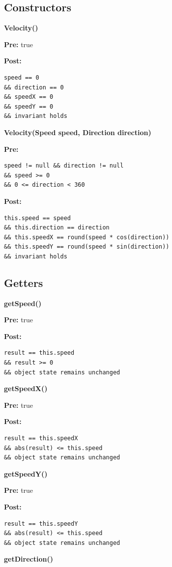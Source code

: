 \subsection*{Constructors}

\textbf{Velocity()}

\textbf{Pre:} true

\textbf{Post:}
\begin{verbatim}
speed == 0
&& direction == 0
&& speedX == 0
&& speedY == 0
&& invariant holds
\end{verbatim}

\textbf{Velocity(Speed speed, Direction direction)}

\textbf{Pre:}
\begin{verbatim}
speed != null && direction != null
&& speed >= 0
&& 0 <= direction < 360
\end{verbatim}

\textbf{Post:}
\begin{verbatim}
this.speed == speed
&& this.direction == direction
&& this.speedX == round(speed * cos(direction))
&& this.speedY == round(speed * sin(direction))
&& invariant holds
\end{verbatim}

\subsection*{Getters}

\textbf{getSpeed()}

\textbf{Pre:} true

\textbf{Post:}
\begin{verbatim}
result == this.speed
&& result >= 0
&& object state remains unchanged
\end{verbatim}

\textbf{getSpeedX()}

\textbf{Pre:} true

\textbf{Post:}
\begin{verbatim}
result == this.speedX
&& abs(result) <= this.speed
&& object state remains unchanged
\end{verbatim}

\textbf{getSpeedY()}

\textbf{Pre:} true

\textbf{Post:}
\begin{verbatim}
result == this.speedY
&& abs(result) <= this.speed
&& object state remains unchanged
\end{verbatim}

\textbf{getDirection()}

